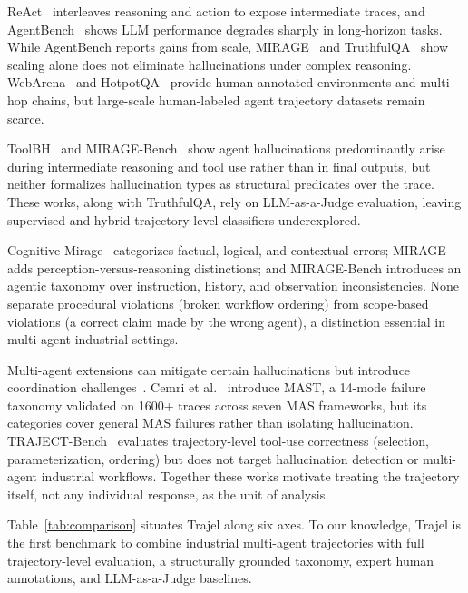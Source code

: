 \documentclass{article}
\begin{document}
ReAct~\cite{yao2023react} interleaves reasoning and action to expose intermediate traces, and AgentBench~\cite{liu2023agentbench} shows LLM performance degrades sharply in long-horizon tasks. While AgentBench reports gains from scale, MIRAGE~\cite{dong2025mirage} and TruthfulQA~\cite{lin2022truthfulqa} show scaling alone does not eliminate hallucinations under complex reasoning. WebArena~\cite{deng2024webarena} and HotpotQA~\cite{yang2018hotpotqa} provide human-annotated environments and multi-hop chains, but large-scale human-labeled agent trajectory datasets remain scarce.

ToolBH~\cite{wu2024toolbh} and MIRAGE-Bench~\cite{zhang2025miragebench} show agent hallucinations predominantly arise during intermediate reasoning and tool use rather than in final outputs, but neither formalizes hallucination types as structural predicates over the trace. These works, along with TruthfulQA, rely on LLM-as-a-Judge evaluation, leaving supervised and hybrid trajectory-level classifiers underexplored.

Cognitive Mirage~\cite{ye2023cognitive} categorizes factual, logical, and contextual errors; MIRAGE adds perception-versus-reasoning distinctions; and MIRAGE-Bench introduces an agentic taxonomy over instruction, history, and observation inconsistencies. None separate procedural violations (broken workflow ordering) from scope-based violations (a correct claim made by the wrong agent), a distinction essential in multi-agent industrial settings.

Multi-agent extensions can mitigate certain hallucinations but introduce coordination challenges~\cite{darwish2025mitigating}. Cemri et al.~\cite{cemri2025mast} introduce MAST, a 14-mode failure taxonomy validated on 1600+ traces across seven MAS frameworks, but its categories cover general MAS failures rather than isolating hallucination. TRAJECT-Bench~\cite{he2026trajectbench} evaluates trajectory-level tool-use correctness (selection, parameterization, ordering) but does not target hallucination detection or multi-agent industrial workflows. Together these works motivate treating the trajectory itself, not any individual response, as the unit of analysis.

Table~\ref{tab:comparison} situates Trajel along six axes. To our knowledge, Trajel is the first benchmark to combine industrial multi-agent trajectories with full trajectory-level evaluation, a structurally grounded taxonomy, expert human annotations, and LLM-as-a-Judge baselines.
\end{document}
